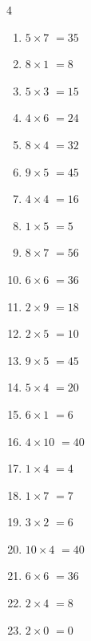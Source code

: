 \begin{multicols}{4}
\begin{enumerate}
  \item $5\times 7$
        $=35$

  \item $8\times 1$
        $=8$

  \item $5\times 3$
        $=15$

  \item $4\times 6$
        $=24$

  \item $8\times 4$
        $=32$

  \item $9\times 5$
        $=45$

  \item $4\times 4$
        $=16$

  \item $1\times 5$
        $=5$

  \item $8\times 7$
        $=56$

  \item $6\times 6$
        $=36$

  \item $2\times 9$
        $=18$

  \item $2\times 5$
        $=10$

  \item $9\times 5$
        $=45$

  \item $5\times 4$
        $=20$

\columnbreak %

  \item $6\times 1$
        $=6$

  \item $4\times 10$
        $=40$

  \item $1\times 4$
        $=4$

  \item $1\times 7$
        $=7$

  \item $3\times 2$
        $=6$

  \item $10\times 4$
        $=40$

  \item $6\times 6$
        $=36$

  \item $2\times 4$
        $=8$

  \item $2\times 0$
        $=0$


\end{enumerate}
\end{multicols}
